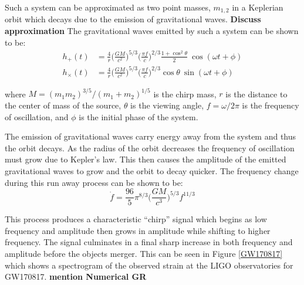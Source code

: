 \documentclass [12pt, proquest]{uwthesis}[2019]
\begin{document}
Such a system can be approximated as two point masses, $m_{1,2}$ in a Keplerian orbit which decays due to the emission of gravitational waves. \textbf{Discuss approximation} The gravitational waves emitted by such a system can be shown to be:
\begin{align}
h_+(t)&=\frac{4}{r}\bigg(\frac{GM}{c^2}\bigg)^{5/3} \bigg( \frac{\pi f}{c} \bigg)^{2/3} \frac{1+\cos^2\theta}{2} \ \cos(\omega t + \phi)\\
h_\times(t)&=\frac{4}{r}\bigg(\frac{GM}{c^2}\bigg)^{5/3} \bigg( \frac{\pi f}{c} \bigg)^{2/3} \cos\theta\ \sin(\omega t + \phi)
\end{align}

where $M=(m_1 m_2)^{3/5}/(m_1+m_2)^{1/5}$ is the chirp mass, $r$ is the distance to the center of mass of the source, $\theta$ is the viewing angle, $f=\omega/2\pi$ is the frequency of oscillation, and $\phi$ is the initial phase of the system.

The emission of gravitational waves carry energy away from the system and thus the orbit decays. As the radius of the orbit decreases the frequency of oscillation must grow due to Kepler's law. This then causes the amplitude of the emitted gravitational waves to grow and the orbit to decay quicker. The frequency change during this run away process can be shown to be:
\begin{equation}
\dot{f}=\frac{96}{5}\pi^{8/3}\bigg(\frac{G M}{c^3}\bigg)^{5/3} f^{11/3}
\end{equation}

This process produces a characteristic ``chirp'' signal which begins as low frequency and amplitude then grows in amplitude while shifting to higher frequency. The signal culminates in a final sharp increase in both frequency and amplitude before the objects merger. This can be seen in Figure \ref{GW170817} which shows a spectrogram of the observed strain at the LIGO observatories for GW170817.
 \textbf{mention Numerical GR}
 
\end{document}
